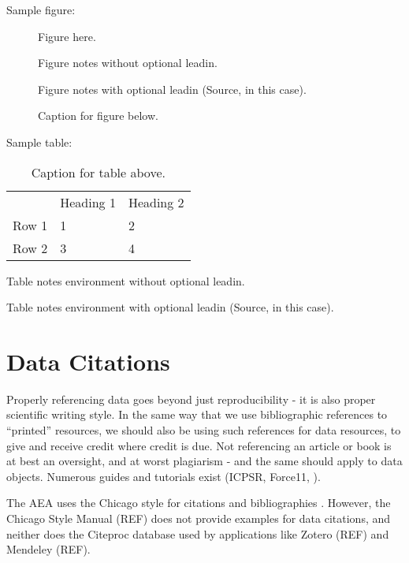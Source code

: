 \documentclass[AEJ]{AEA}
\begin{document}
Sample figure:

\begin{figure}
Figure here.

\caption{Caption for figure below.}
\begin{figurenotes}
Figure notes without optional leadin.
\end{figurenotes}
\begin{figurenotes}[Source]
Figure notes with optional leadin (Source, in this case).
\end{figurenotes}
\end{figure}

Sample table:

\begin{table}
\caption{Caption for table above.}

\begin{tabular}{lll}
& Heading 1 & Heading 2 \\ 
Row 1 & 1 & 2 \\ 
Row 2 & 3 & 4%
\end{tabular}
\begin{tablenotes}
Table notes environment without optional leadin.
\end{tablenotes}
\begin{tablenotes}[Source]
Table notes environment with optional leadin (Source, in this case).
\end{tablenotes}
\end{table}

\section{Data Citations}
Properly referencing data goes beyond just reproducibility - it is also proper scientific writing style. In the same way that we use bibliographic references to ``printed'' resources, we should also be using such references for data resources, to give and receive credit where credit is due. Not referencing an article or book is at best an oversight, and at worst plagiarism - and the same should apply to data objects. Numerous guides and tutorials exist (ICPSR, Force11, \cite{dataone-l09}).

The AEA uses the Chicago style for citations and bibliographies \citep{aeadatarefs}. However, the Chicago Style Manual (REF) does not provide examples for data citations, and neither does the Citeproc database used by applications like Zotero (REF) and Mendeley (REF).
\end{document}
